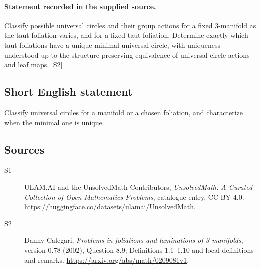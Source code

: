 \documentclass[11pt]{article}
\newcommand{\sref}[2]{\hyperlink{source:#1:#2}{[S#2]}}
\begin{document}
\paragraph{Statement recorded in the supplied source.}
Classify possible universal circles and their group actions for a fixed $3$-manifold as the taut foliation varies, and for a fixed taut foliation. Determine exactly which taut foliations have a unique minimal universal circle, with uniqueness understood up to the structure-preserving equivalence of universal-circle actions and leaf maps. \sref{statement}{2}
\subsection{Short English statement}
Classify universal circles for a manifold or a chosen foliation, and characterize when the minimal one is unique.
\subsection{Sources}
\begin{description}
\item[\hypertarget{source:statement:1}{S1}] ULAM.AI and the UnsolvedMath Contributors, \emph{UnsolvedMath: A Curated Collection of Open Mathematics Problems}, catalogue entry. CC BY 4.0. \url{https://huggingface.co/datasets/ulamai/UnsolvedMath}.
\item[\hypertarget{source:statement:2}{S2}] Danny Calegari, \emph{Problems in foliations and laminations of 3-manifolds}, version 0.78 (2002), Question 8.9; Definitions 1.1--1.10 and local definitions and remarks. \url{https://arxiv.org/abs/math/0209081v1}.
\end{description}
\label{end:statement}
\end{document}

